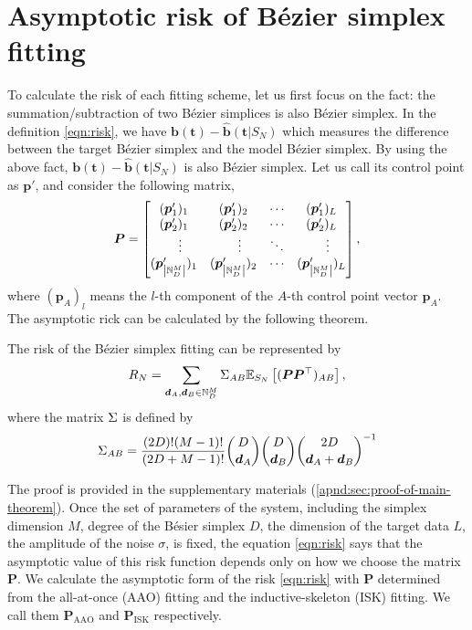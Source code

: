 \documentclass{article}
\begin{document}
\section{Asymptotic risk of B\'ezier simplex fitting}\label{sec:asymptotic-risk}
To calculate the risk of each fitting scheme, let us first focus on the fact: the summation/subtraction of two B\'ezier simplices is also B\'ezier simplex.
In the definition \cref{eqn:risk}, we have $\bm b(\bm t) - \hat{\bm b}(\bm t | S_N)$ which measures the difference between the target B\'ezier simplex and the model B\'ezier simplex.
By using the above fact, $\bm b(\bm t) - \hat{\bm b}(\bm t | S_N)$ is also B\'ezier simplex.
Let us call its control point as $\bm p'$, and consider the following matrix,
\begin{align}
\bm P
=
\begin{bmatrix}
(\bm p_1')_1 &
(\bm p_1')_2 & 
\cdots &
(\bm p_1')_L 
\\
(\bm p_2')_1 &
(\bm p_2')_2 & 
\cdots &
(\bm p_2')_L 
\\
\quad \vdots&
\quad \vdots & 
\ddots &
\quad \vdots
\\
(\bm p_{\left| \mathbb{N}_D^M \right|}')_1 &
(\bm p_{\left| \mathbb{N}_D^M \right|}')_2 & 
\cdots &
(\bm p_{\left| \mathbb{N}_D^M \right|}')_L 
\end{bmatrix}
,
\end{align}
where $(\bm p_A)_{l}$ means the $l$-th component of the $A$-th control point vector $\bm p_A$.
The asymptotic rick can be calculated by the following theorem.
\begin{theorem}\label{thm:risk}
The risk of the B\'ezier simplex fitting can be represented by
\begin{align}
R_N
=
\sum_{\bm d_A, \bm d_B \in \mathbb{N}_D^M}
\Sigma_{AB}
\mathbb{E}_{S_N} \left[({\bm P} {\bm P}^\top)_{AB} \right]
,
\label{eqn:risk}
\end{align}
where the matrix $\Sigma$ is defined by
\begin{align}
\Sigma_{AB}
=
\frac{(2D)!(M-1)!}{(2D+M-1)!}
  \binom{D}{\bm d_A}
  \binom{D}{\bm d_B}
  \binom{2D}{\bm d_A + \bm d_B}^{-1}
  \label{eqn:ZZ-def}
\end{align}
\end{theorem}
The proof is provided in the supplementary materials (\cref{apnd:sec:proof-of-main-theorem}).
Once the set of parameters of the system, including the simplex dimension $M$, degree of the B\'esier simplex $D$, the dimension of the target data $L$, the amplitude of the noise $\sigma$, is fixed, the equation \cref{eqn:risk} says that the asymptotic value of this risk function depends only on how we choose the matrix $\bm P$.
We calculate the asymptotic form of the risk \cref{eqn:risk} with $\bm P$ determined from the all-at-once (AAO) fitting and the inductive-skeleton (ISK) fitting.
We call them $\bm P_\mathrm{AAO}$ and $\bm P_\mathrm{ISK}$ respectively.
\end{document}
